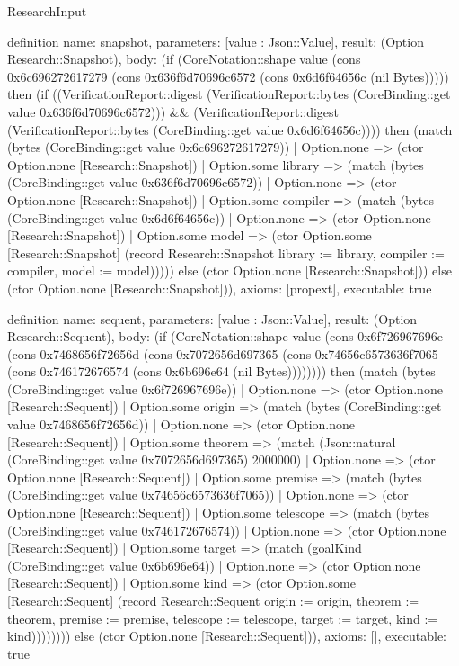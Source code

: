 \begin{lexlean}{ResearchInput}
\begin{semanticmodule}
definition{
 name: snapshot,
 parameters: [value : Json::Value],
 result: (Option Research::Snapshot),
 body: (if (CoreNotation::shape value (cons 0x6c696272617279 (cons 0x636f6d70696c6572 (cons 0x6d6f64656c (nil Bytes))))) then (if ((VerificationReport::digest (VerificationReport::bytes (CoreBinding::get value 0x636f6d70696c6572))) && (VerificationReport::digest (VerificationReport::bytes (CoreBinding::get value 0x6d6f64656c)))) then (match (bytes (CoreBinding::get value 0x6c696272617279)) | Option.none => (ctor Option.none [Research::Snapshot]) | Option.some library => (match (bytes (CoreBinding::get value 0x636f6d70696c6572)) | Option.none => (ctor Option.none [Research::Snapshot]) | Option.some compiler => (match (bytes (CoreBinding::get value 0x6d6f64656c)) | Option.none => (ctor Option.none [Research::Snapshot]) | Option.some model => (ctor Option.some [Research::Snapshot] (record Research::Snapshot {library := library, compiler := compiler, model := model}))))) else (ctor Option.none [Research::Snapshot])) else (ctor Option.none [Research::Snapshot])),
 axioms: [propext],
 executable: true
}

definition{
 name: sequent,
 parameters: [value : Json::Value],
 result: (Option Research::Sequent),
 body: (if (CoreNotation::shape value (cons 0x6f726967696e (cons 0x7468656f72656d (cons 0x7072656d697365 (cons 0x74656c6573636f7065 (cons 0x746172676574 (cons 0x6b696e64 (nil Bytes)))))))) then (match (bytes (CoreBinding::get value 0x6f726967696e)) | Option.none => (ctor Option.none [Research::Sequent]) | Option.some origin => (match (bytes (CoreBinding::get value 0x7468656f72656d)) | Option.none => (ctor Option.none [Research::Sequent]) | Option.some theorem => (match (Json::natural (CoreBinding::get value 0x7072656d697365) 2000000) | Option.none => (ctor Option.none [Research::Sequent]) | Option.some premise => (match (bytes (CoreBinding::get value 0x74656c6573636f7065)) | Option.none => (ctor Option.none [Research::Sequent]) | Option.some telescope => (match (bytes (CoreBinding::get value 0x746172676574)) | Option.none => (ctor Option.none [Research::Sequent]) | Option.some target => (match (goalKind (CoreBinding::get value 0x6b696e64)) | Option.none => (ctor Option.none [Research::Sequent]) | Option.some kind => (ctor Option.some [Research::Sequent] (record Research::Sequent {origin := origin, theorem := theorem, premise := premise, telescope := telescope, target := target, kind := kind})))))))) else (ctor Option.none [Research::Sequent])),
 axioms: [],
 executable: true
}


\end{semanticmodule}
\end{lexlean}
